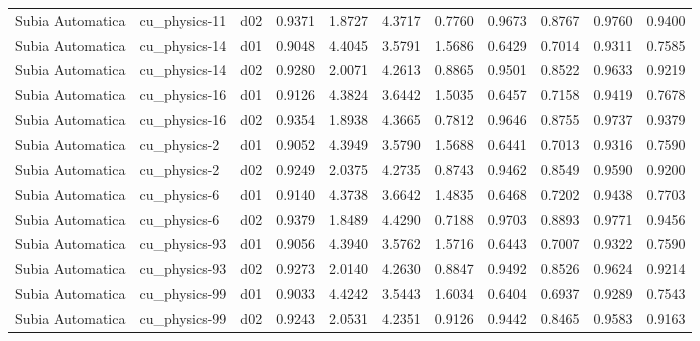 \begin{longtable}{lllrrrrrrrr}
     Subia Automatica  &         cu\_physics-11 &     d02 &   0.9371 &   1.8727 &   4.3717 &       0.7760 &        0.9673 &       0.8767 &           0.9760 &  0.9400 \\
     Subia Automatica  &         cu\_physics-14 &     d01 &   0.9048 &   4.4045 &   3.5791 &       1.5686 &        0.6429 &       0.7014 &           0.9311 &  0.7585 \\
     Subia Automatica  &         cu\_physics-14 &     d02 &   0.9280 &   2.0071 &   4.2613 &       0.8865 &        0.9501 &       0.8522 &           0.9633 &  0.9219 \\
     Subia Automatica  &         cu\_physics-16 &     d01 &   0.9126 &   4.3824 &   3.6442 &       1.5035 &        0.6457 &       0.7158 &           0.9419 &  0.7678 \\
     Subia Automatica  &         cu\_physics-16 &     d02 &   0.9354 &   1.8938 &   4.3665 &       0.7812 &        0.9646 &       0.8755 &           0.9737 &  0.9379 \\
     Subia Automatica  &          cu\_physics-2 &     d01 &   0.9052 &   4.3949 &   3.5790 &       1.5688 &        0.6441 &       0.7013 &           0.9316 &  0.7590 \\
     Subia Automatica  &          cu\_physics-2 &     d02 &   0.9249 &   2.0375 &   4.2735 &       0.8743 &        0.9462 &       0.8549 &           0.9590 &  0.9200 \\
     Subia Automatica  &          cu\_physics-6 &     d01 &   0.9140 &   4.3738 &   3.6642 &       1.4835 &        0.6468 &       0.7202 &           0.9438 &  0.7703 \\
     Subia Automatica  &          cu\_physics-6 &     d02 &   0.9379 &   1.8489 &   4.4290 &       0.7188 &        0.9703 &       0.8893 &           0.9771 &  0.9456 \\
     Subia Automatica  &         cu\_physics-93 &     d01 &   0.9056 &   4.3940 &   3.5762 &       1.5716 &        0.6443 &       0.7007 &           0.9322 &  0.7590 \\
     Subia Automatica  &         cu\_physics-93 &     d02 &   0.9273 &   2.0140 &   4.2630 &       0.8847 &        0.9492 &       0.8526 &           0.9624 &  0.9214 \\
     Subia Automatica  &         cu\_physics-99 &     d01 &   0.9033 &   4.4242 &   3.5443 &       1.6034 &        0.6404 &       0.6937 &           0.9289 &  0.7543 \\
     Subia Automatica  &         cu\_physics-99 &     d02 &   0.9243 &   2.0531 &   4.2351 &       0.9126 &        0.9442 &       0.8465 &           0.9583 &  0.9163 \\

\end{longtable}
